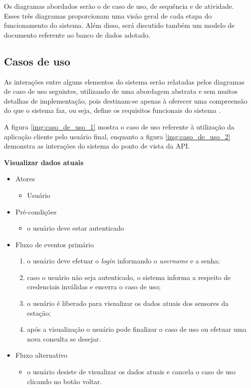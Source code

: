Os diagramas abordados serão o de caso de uso, de sequência e de atividade. Esses três diagramas proporcionam uma visão geral de cada etapa do funcionamento do sistema. Além disso, será discutido também um modelo de documento referente ao banco de dados adotado.

\subsection{Casos de uso} \label{subsec:casosDeUso}

As interações entre alguns elementos do sistema serão relatadas pelos diagramas de caso de uso seguintes, utilizando de uma abordagem abstrata e sem muitos detalhas de implementação, pois destinam-se apenas à oferecer uma compreensão do que o sistema faz, ou seja, define os requisitos funcionais do sistema \cite{sommerville2011engenharia}.

A figura \ref{img:caso_de_uso_1} mostra o caso de uso referente à utilização da aplicação cliente pelo usuário final, enquanto a figura \ref{img:caso_de_uso_2} demonstra as interações do sistema do ponto de vista da API.

\newpage

\textbf{Visualizar dados atuais}

\begin{itemize}
    \item Atores
    \begin{itemize}
        \item Usuário
    \end{itemize}
    
    \item Pré-condições
    \begin{itemize}
        \item o usuário deve estar autenticado
    \end{itemize}

    \item Fluxo de eventos primário
    \begin{enumerate}
        \item o usuário deve efetuar o \textit{login} informando o \textit{username} e a senha;
        \item caso o usuário não seja autenticado, o sistema informa a respeito de credenciais inválidas e encerra o caso de uso;
        \item o usuário é liberado para visualizar os dados atuais dos sensores da estação;
        \item após a visualização o usuário pode finalizar o caso de uso ou efetuar uma nova consulta se desejar.
    \end{enumerate}

    \item Fluxo alternativo
    \begin{itemize}
       \item o usuário desiste de visualizar os dados atuais e cancela o caso de uso clicando no botão voltar.
    \end{itemize}

\end{itemize}

